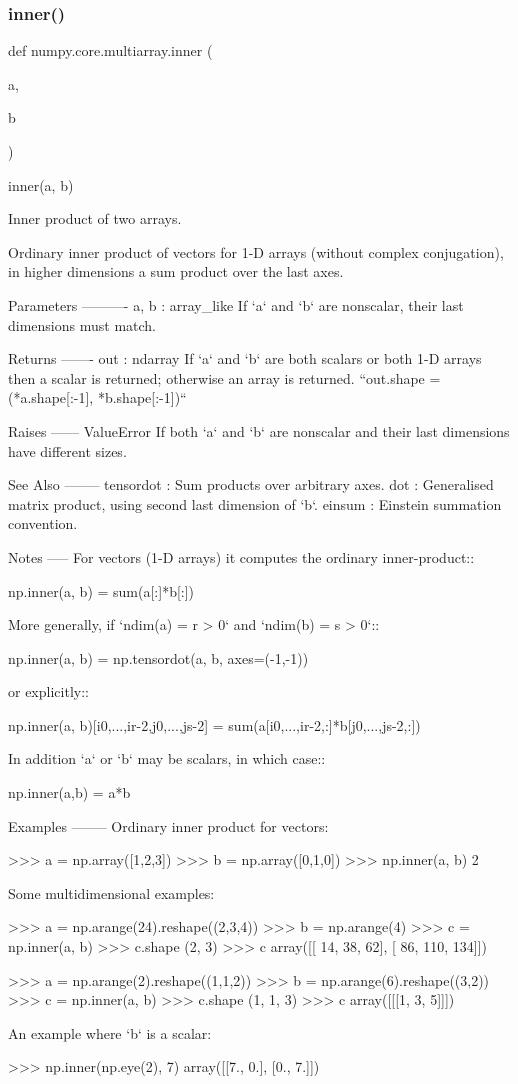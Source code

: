 \subsubsection{\texorpdfstring{inner()}{inner()}}
{\footnotesize\ttfamily def numpy.\+core.\+multiarray.\+inner (\begin{DoxyParamCaption}\item[{}]{a,  }\item[{}]{b }\end{DoxyParamCaption})}

\begin{DoxyVerb}inner(a, b)

Inner product of two arrays.

Ordinary inner product of vectors for 1-D arrays (without complex
conjugation), in higher dimensions a sum product over the last axes.

Parameters
----------
a, b : array_like
    If `a` and `b` are nonscalar, their last dimensions must match.

Returns
-------
out : ndarray
    If `a` and `b` are both
    scalars or both 1-D arrays then a scalar is returned; otherwise
    an array is returned.
    ``out.shape = (*a.shape[:-1], *b.shape[:-1])``

Raises
------
ValueError
    If both `a` and `b` are nonscalar and their last dimensions have
    different sizes.

See Also
--------
tensordot : Sum products over arbitrary axes.
dot : Generalised matrix product, using second last dimension of `b`.
einsum : Einstein summation convention.

Notes
-----
For vectors (1-D arrays) it computes the ordinary inner-product::

    np.inner(a, b) = sum(a[:]*b[:])

More generally, if `ndim(a) = r > 0` and `ndim(b) = s > 0`::

    np.inner(a, b) = np.tensordot(a, b, axes=(-1,-1))

or explicitly::

    np.inner(a, b)[i0,...,ir-2,j0,...,js-2]
         = sum(a[i0,...,ir-2,:]*b[j0,...,js-2,:])

In addition `a` or `b` may be scalars, in which case::

   np.inner(a,b) = a*b

Examples
--------
Ordinary inner product for vectors:

>>> a = np.array([1,2,3])
>>> b = np.array([0,1,0])
>>> np.inner(a, b)
2

Some multidimensional examples:

>>> a = np.arange(24).reshape((2,3,4))
>>> b = np.arange(4)
>>> c = np.inner(a, b)
>>> c.shape
(2, 3)
>>> c
array([[ 14,  38,  62],
       [ 86, 110, 134]])

>>> a = np.arange(2).reshape((1,1,2))
>>> b = np.arange(6).reshape((3,2))
>>> c = np.inner(a, b)
>>> c.shape
(1, 1, 3)
>>> c
array([[[1, 3, 5]]])

An example where `b` is a scalar:

>>> np.inner(np.eye(2), 7)
array([[7., 0.],
       [0., 7.]])\end{DoxyVerb}
